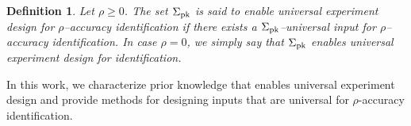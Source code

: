 \documentclass[journal,twoside,web]{ieeecolor}
\DeclareMathOperator{\rad}{rad}
\newtheorem{proposition}[theorem]{Proposition}
\newtheorem{problem}[theorem]{Problem}
\newtheorem{definition}[theorem]{Definition}
\begin{document}



\begin{definition}
\label{def:enable_universal_experiment_noisy}
Let $\rho\geq 0$. The set $\Sigma_\textup{pk}$ is said to \emph{enable universal experiment design for $\rho$--accuracy identification} if there exists a $\Sigma_\textup{pk}$--universal input for $\rho$--accuracy identification. In case $\rho=0$, we simply say that $\Sigma_\textup{pk}$ \emph{enables universal experiment design for identification}. 
\end{definition}

In this work, we characterize prior knowledge that enables universal experiment design and provide methods for designing inputs that are universal for $\rho$-accuracy identification. 


\end{document}
